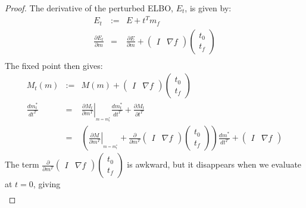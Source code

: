 \begin{proof}
  The derivative of the perturbed ELBO, $E_t$, is given by:
  \begin{eqnarray*}
  E_{t} & := & E+t^{T}m_{f}\\
  \frac{\partial E_{t}}{\partial m} & = &
  \frac{\partial E}{\partial m}+\left(\begin{array}{cc}
  I & \nabla f\end{array}\right)\left(\begin{array}{c}
  t_{0}\\
  t_{f}
  \end{array}\right)\\
  \end{eqnarray*}
  The fixed point  then gives:
  \begin{eqnarray*}
  M_{t}\left(m\right) & := & M\left(m\right)+\left(\begin{array}{cc}
  I & \nabla f\end{array}\right)\left(\begin{array}{c}
  t_{0}\\
  t_{f}
  \end{array}\right)\\
  \frac{dm_{t}^{*}}{dt^{T}} & = &
    \left.\frac{\partial M_{t}}{\partial m^{T}}\right|_{_{m=m_{t}^{*}}}
    \frac{dm_{t}^{*}}{dt^{T}}+\frac{\partial M_{t}}{\partial t^{T}}\\
   & = & \left(\left.\frac{\partial M}{\partial m^{T}}\right|_{_{m=m_{t}^{*}}}+
   \frac{\partial}{\partial m^{T}}\left(\begin{array}{cc}
  I & \nabla f\end{array}\right)\left(\begin{array}{c}
  t_{0}\\
  t_{f}
  \end{array}\right)\right)\frac{dm^{*}}{dt^{T}}+\left(\begin{array}{cc}
  I & \nabla f\end{array}\right)
  \end{eqnarray*}
  The term $\frac{\partial}{\partial m^{T}}\left(\begin{array}{cc}
  I & \nabla f\end{array}\right)\left(\begin{array}{c}
  t_{0}\\
  t_{f}
  \end{array}\right)$ is awkward, but it disappears when we evaluate at $t=0$,
  giving
  \begin{eqnarray*}

\end{eqnarray*}
\end{proof}

